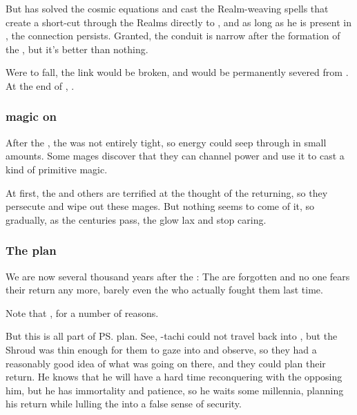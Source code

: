 But \Daggerrain{} has solved the cosmic equations and cast the Realm-weaving spells that create a short-cut through the Realms directly to \Erebos, and as long as he is present in \Nyx, the connection persists.
Granted, the conduit is narrow after the formation of the , but it's better than nothing. 

Were \Daggerrain{} to fall, the link would be broken, and \Nyx{} would be permanently severed from \Erebos. At the end of \SentinelsFinalBook, . 





\subsubsection{\Bane{} magic on \Miith}
After the \firstbanewar, the \CrystalSphere{} was not entirely tight, so \Erebean{} energy could seep through in small amounts. Some mages discover that they can channel \bane{} power and use it to cast a kind of primitive \nieur{} magic. 

At first, the \dragons{} and others are terrified at the thought of the \banes{} returning, so they persecute and wipe out these mages. But nothing seems to come of it, so gradually, as the centuries pass, the \dragons{} glow lax and stop caring. 





\subsubsection{The \pps{\banes}{} plan}
We are now several thousand years after the \firstbanewar: The \banes{} are forgotten and no one fears their return any more, barely even the \dragons{} who actually fought them last time. 

Note that , for a number of reasons. 

But this is all part of \ps{\Daggerrain}{} plan. See, \Daggerrain-tachi could not travel back into \Miith{}, but the Shroud was thin enough for them to gaze into \Miith{} and observe, so they had a reasonably good idea of what was going on there, and they could plan their return. He knows that he will have a hard time reconquering \Miith{} with the \dragons{} opposing him, but he has immortality and patience, so he waits some millennia, planning his return while lulling the \dragons{} into a false sense of security. 

